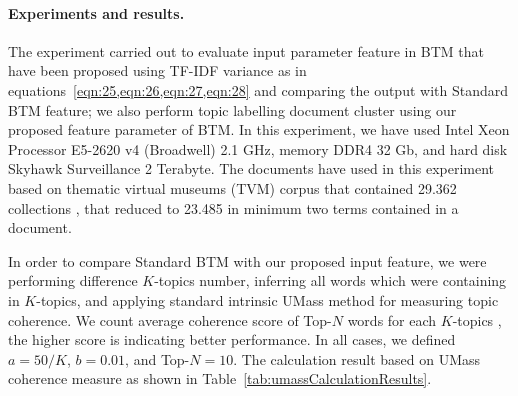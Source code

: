 \paragraph{Experiments and results.} The experiment carried out to evaluate input parameter feature in BTM that have been proposed using TF-IDF variance as in equations~\cref{eqn:25,eqn:26,eqn:27,eqn:28} and comparing the output with Standard BTM feature; we also perform topic labelling document cluster using our proposed feature parameter of BTM. In this experiment, we have used Intel Xeon Processor E5-2620 v4 (Broadwell) 2.1 GHz, memory DDR4 32 Gb, and hard disk Skyhawk Surveillance 2 Terabyte. The documents have used in this experiment based on thematic virtual museums (TVM) corpus that contained 29.362 collections \cite{AnggaiBlekanovSergeev2018}, that reduced to 23.485 in minimum two terms contained in a document.

In order to compare Standard BTM with our proposed input feature, we were performing difference \(K\)-topics number, inferring all words which were containing in \(K\)-topics, and applying standard intrinsic UMass method for measuring topic coherence. We count average coherence score of Top-\(N\) words for each \(K\)-topics \cite{YanGuoLan}, the higher score is indicating better performance. In all cases, we defined \(a = 50/K\), \(b = 0.01\), and Top-\(N = 10\). The calculation result based on UMass coherence measure as shown in Table~\cref{tab:umassCalculationResults}.

